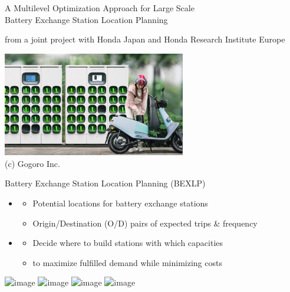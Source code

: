 \documentclass[aspectratio=1610]{beamer}
\begin{document}
\begin{frame}{A Multilevel Optimization Approach for
	Large Scale\\ Battery Exchange Station Location Planning}

\citep{jatschka-23}

\medskip
from a joint project with Honda Japan and Honda Research Institute Europe

\bigskip
\begin{center}
	\includegraphics[width=0.6\textwidth]{graphics/Gogoro_Swapping_Station.jpg}\\
	{\small (c) Gogoro Inc.}
\end{center}
\end{frame}

\begin{frame}{Battery Exchange Station Location Planning (BEXLP)}
\begin{itemize}
\item {} 
	\begin{itemize}
		\item Potential locations for battery exchange stations
		\item Origin/Destination (O/D) pairs of expected trips \& frequency
	\end{itemize}
\item {}
	\begin{itemize}
		\item Decide where to build stations with which capacities
		\item to maximize fulfilled demand while minimizing costs
	\end{itemize}
\end{itemize}

\begin{center}
	\includegraphics<1>[width=0.5\textwidth]{graphics/bex1.jpg}
	\includegraphics<2>[width=0.5\textwidth]{graphics/bex2.jpg}
	\includegraphics<3>[width=0.5\textwidth]{graphics/bex3.jpg}
	\includegraphics<4>[width=0.5\textwidth]{graphics/bex4.jpg}
\end{center}
\end{frame}
\end{document}
